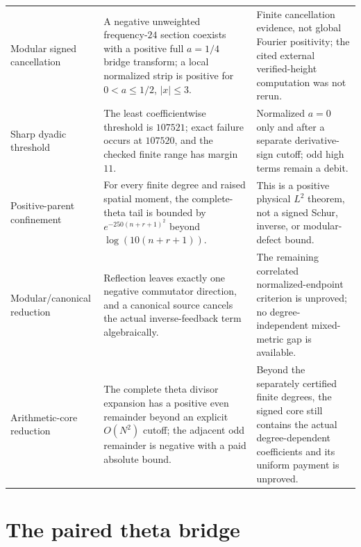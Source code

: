 \documentclass[11pt]{article}
\theoremstyle{definition}
\theoremstyle{remark}
\begin{document}
\begin{longtable}{>{\raggedright\arraybackslash}p{}
                  >{\raggedright\arraybackslash}p{}
                  >{\raggedright\arraybackslash}p{}}
Modular signed cancellation & A negative unweighted frequency-$24$ section coexists with a positive full $a=1/4$ bridge transform; a local normalized strip is positive for $0<a\le1/2$, $|x|\le3$. & Finite cancellation evidence, not global Fourier positivity; the cited external verified-height computation was not rerun. \\
Sharp dyadic threshold & The least coefficientwise threshold is $107521$; exact failure occurs at $107520$, and the checked finite range has margin $11$. & Normalized $a=0$ only and after a separate derivative-sign cutoff; odd high terms remain a debit. \\
Positive-parent confinement & For every finite degree and raised spatial moment, the complete-theta tail is bounded by $e^{-250(n+r+1)^2}$ beyond $\log(10(n+r+1))$. & This is a positive physical $L^2$ theorem, not a signed Schur, inverse, or modular-defect bound. \\
Modular/canonical reduction & Reflection leaves exactly one negative commutator direction, and a canonical source cancels the actual inverse-feedback term algebraically. & The remaining correlated normalized-endpoint criterion is unproved; no degree-independent mixed-metric gap is available. \\
Arithmetic-core reduction & The complete theta divisor expansion has a positive even remainder beyond an explicit $O(N^2)$ cutoff; the adjacent odd remainder is negative with a paid absolute bound. & Beyond the separately certified finite degrees, the signed core still contains the actual degree-dependent coefficients and its uniform payment is unproved. \\
\bottomrule
\end{longtable}

\section{The paired theta bridge}
\end{document}

